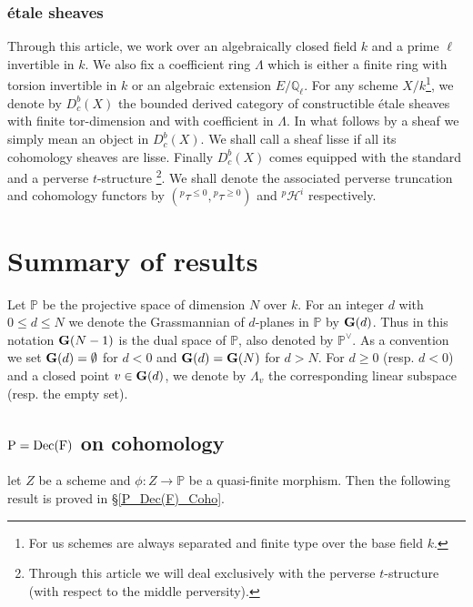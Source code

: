\documentclass[12pt, reqno]{amsart}
\theoremstyle{plain}
\theoremstyle{definition}
\theoremstyle{definition}
\newcommand{\bbP}{{\mathbb P}}
\newcommand{\bbQ}{{\mathbb Q}}
\newcommand{\bG}{{\bf G}}
\newcommand{\cpH}{{^p\mathcal{H}}}
\begin{document}
\subsubsection{\'etale sheaves}
Through this article, we work over an algebraically closed field $k$ and a prime $\ell$ invertible in $k$. We also fix a coefficient ring $\Lambda$ which is either a finite ring with torsion invertible in $k$ or an algebraic extension $E/\bbQ_{\ell}$. For any scheme $X/k$\footnote{For us schemes are always separated and finite type over the base field $k$.}, we denote by $D^b_c(X)$ the bounded derived category of constructible \'etale sheaves with finite tor-dimension and with coefficient in $\Lambda$. In what follows by a sheaf we simply mean an object in $D^b_c(X)$. We shall call a sheaf lisse if all its cohomology sheaves are lisse. Finally $D^b_c(X)$ comes equipped with the standard \cite[1.1.2, (e)]{Del80} and a perverse $t$-structure \cite[\S 4.0]{BBDG18}\footnote{Through this article we will deal exclusively with the perverse $t$-structure (with respect to the middle perversity).}. We shall denote the associated perverse truncation and cohomology functors by $(^p\tau^{\leq 0},{}^p\tau^{\geq 0})$ and $\cpH^i$ respectively.





\section{Summary of results}


Let $\bbP$ be the projective space of dimension $N$ over $k$. For an integer $d$ with $0 \leq d \leq N$ we denote the Grassmannian of $d$-planes in $\bbP$ by $\bG(d)$. Thus in this notation $\bG(N-1)$ is the dual space of $\bbP$, also denoted by $\bbP^{\vee}$. As a convention we set $\bG(d)=\emptyset$ for $d<0$ and $\bG(d)=\bG(N)$ for $d > N$. For $d \geq 0$ (resp. $d<0$) and a closed point $v \in \bG(d)$, we denote by $\Lambda_v$ the corresponding linear subspace (resp. the empty set).



\subsection{$\textup{P}=\textup{Dec(F)}$ on cohomology}

let $Z$ be a scheme and $\phi \colon Z \to \bbP$ be a quasi-finite morphism. Then the following result is proved in \S \ref{P_Dec(F)_Coho}.
\end{document}
